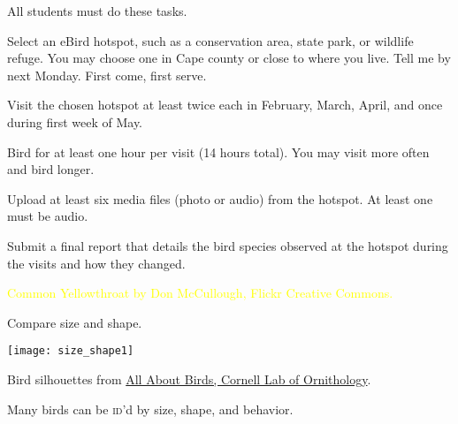 \documentclass[t,handout]{beamer}  %
\begin{document}
{
\begin{frame}{All  students must do these tasks.}

\vspace{-\baselineskip}

\hangpara Select an eBird hotspot, such as a conservation area, state park, or wildlife refuge. You may choose one in Cape county or close to where you live. Tell me by next Monday. First come, first serve.

\hangpara Visit the chosen hotspot at least twice each in February, March, April, and once during first week of May.

\hangpara Bird for at least one hour per visit (14 hours total). You may visit more often and bird longer. 


\hangpara Upload at least six media files (photo or audio) from the hotspot. At least one must be audio.

\hangpara Submit a final report that details the bird species observed at the hotspot during the visits and how they changed. 

\end{frame}
}


{
\begin{frame}[b,plain]
	\tiny\textcolor{yellow}{Common Yellowthroat by Don McCullough, Flickr Creative Commons.}
\end{frame}
}

\begin{frame}[b,plain]{Compare size and shape.}
	\begin{center}
		\texttt{[image: size\_shape1]}
	\end{center}
	\tiny Bird silhouettes from \href{http://allaboutbirds.com}{All About Birds, Cornell Lab of Ornithology}.
\end{frame}


{
\begin{frame}[t,plain]{Many birds can be \textsc{id}'d by size, shape, and behavior.}

	\vfilll
	
	\tiny\hfill{}
\end{frame}
}
\end{document}
